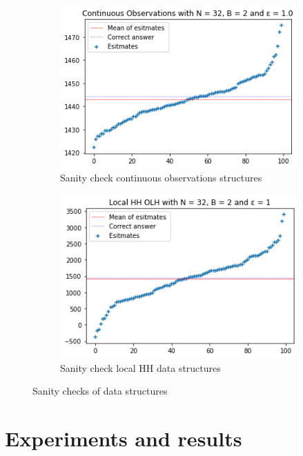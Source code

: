 \documentclass[11pt]{article}
\theoremstyle{definition}
\begin{document}
\begin{figure}
\begin{subfigure}{.5\textwidth}
  \centering
  \includegraphics[width=\linewidth]{figures/tests/cen_hh/b=2.png}
  \caption{Sanity check continuous observations structures}
  \label{fig:test_c_hh}
\end{subfigure}%
\begin{subfigure}{.5\textwidth}
  \centering
  \includegraphics[width=\linewidth]{figures/tests/local_hh/b=2.png}
  \caption{Sanity check local HH data structures}
  \label{fig:test_l_hh}
\end{subfigure}%
\caption{Sanity checks of data structures}
\label{fig:hh_sainty}
\end{figure}


\section{Experiments and results}
\end{document}
